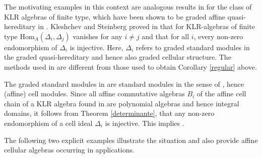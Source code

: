 \documentclass[oneside, a4paper, 11pt]{amsart}
\newcommand{\Hom}{\mathrm{Hom}}
\begin{document}
The motivating examples in this context are analogous results in \cite{KS}
for the class of KLR algebras of finite type,
which have been shown to be graded affine quasi-hereditary in \cites{KLM,KL,KS}.
Kleshchev and Steinberg proved in \cite{KS} that for KLR-algebras of
finite type $\Hom_A(\Delta_i,\Delta_j)$ vanishes  for any $i\neq j$ and that
for all $i$, every non-zero endomorphism of $\Delta_i$ is injective. Here,
$\Delta_i$ refers to graded standard modules in the graded quasi-hereditary
and hence also graded cellular structure. The methods used in \cite{KS} are
different from those used to obtain  Corollary \ref{regular} above. 

The graded standard modules in \cite{KS} are standard modules in the sense
of \cite{KXaffine}, hence (affine) cell modules. 
Since all affine commutative algebras $B_i$ of the affine cell chain
of a KLR algebra found in \cite{KL} are polynomial algebras and hence integral
domains, it follows from Theorem \ref{determinante}, that any non-zero
endomorphism of a cell ideal $\Delta_i$ is injective. This implies
\cite[Theorem B]{KS}.
\medskip

The following two explicit examples illustrate the situation and also provide
affine cellular algebras occurring in applications. 
\end{document}
